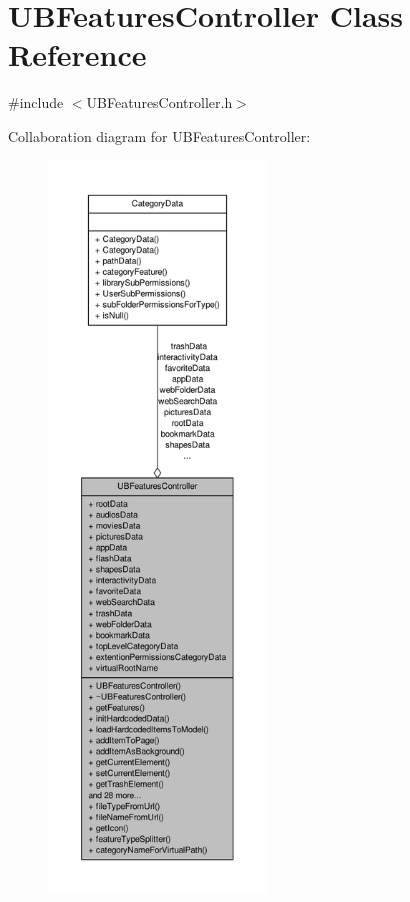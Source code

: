 \hypertarget{class_u_b_features_controller}{\section{U\-B\-Features\-Controller Class Reference}
\label{d8/d33/class_u_b_features_controller}
}


{\ttfamily \#include $<$U\-B\-Features\-Controller.\-h$>$}



Collaboration diagram for U\-B\-Features\-Controller\-:
\nopagebreak
\begin{figure}[H]
\begin{center}
\leavevmode
\includegraphics[height=550pt]{de/db5/class_u_b_features_controller__coll__graph}
\end{center}
\end{figure}
